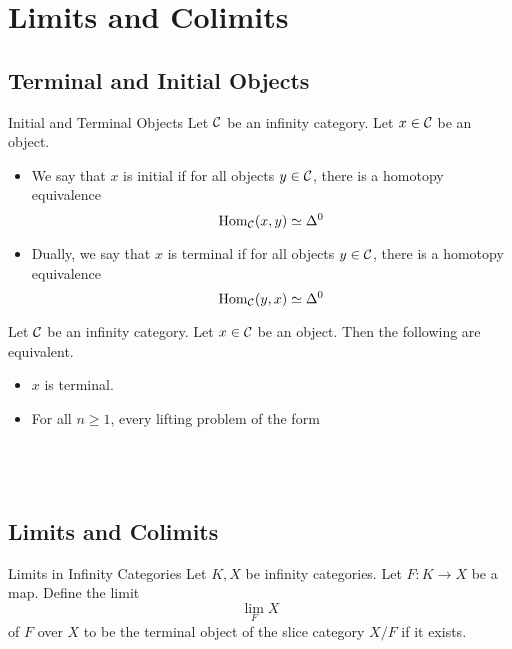 \documentclass[a4paper]{article}
\begin{document}
\pagebreak
\section{Limits and Colimits}
\subsection{Terminal and Initial Objects}
\begin{defn}{Initial and Terminal Objects}{} Let $\mathcal{C}$ be an infinity category. Let $x\in\mathcal{C}$ be an object. 
\begin{itemize}
\item We say that $x$ is initial if for all objects $y\in\mathcal{C}$, there is a homotopy equivalence $$\operatorname{Hom}_{\mathcal{C}}(x,y)\simeq\Delta^0$$
\item Dually, we say that $x$ is terminal if for all objects $y\in\mathcal{C}$, there is a homotopy equivalence $$\operatorname{Hom}_{\mathcal{C}}(y,x)\simeq\Delta^0$$
\end{itemize}
\end{defn}

\begin{prp}{}{} Let $\mathcal{C}$ be an infinity category. Let $x\in\mathcal{C}$ be an object. Then the following are equivalent. 
\begin{itemize}
\item $x$ is terminal. 
\item For all $n\geq 1$, every lifting problem of the form \\~\\
\\~\\
\end{itemize}
\end{prp}

\subsection{Limits and Colimits}
\begin{defn}{Limits in Infinity Categories}{} Let $K,X$ be infinity categories. Let $F:K\to X$ be a map. Define the limit $$\lim_FX$$of $F$ over $X$ to be the terminal object of the slice category $X/F$ if it exists. 
\end{defn}
\end{document}
